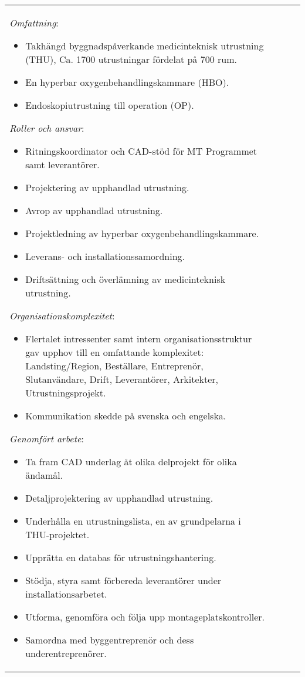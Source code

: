 \documentclass[a4paper, 10pt]{article}
\begin{document}
\begin{longtable}{@{\extracolsep{\fill}}p{} p{} Rp{0.1\textwidth}}
    \textit{Omfattning}:
    \begin{itemize}
        \item Takhängd byggnadspåverkande medicinteknisk utrustning (THU), Ca. 1700 utrustningar fördelat på 700 rum.
        \item En hyperbar oxygenbehandlingskammare (HBO).
        \item Endoskopiutrustning till operation (OP).
    \end{itemize}
    \textit{Roller och ansvar}:
    \begin{itemize}
        \item Ritningskoordinator och CAD-stöd för MT Programmet samt leverantörer.
        \item Projektering av upphandlad utrustning.
        \item Avrop av upphandlad utrustning.
        \item Projektledning av hyperbar oxygenbehandlingskammare.
        \item Leverans- och installationssamordning.
        \item Driftsättning och överlämning av medicinteknisk utrustning.
    \end{itemize}
    \textit{Organisationskomplexitet}:
    \begin{itemize}
        \item Flertalet intressenter samt intern organisationsstruktur gav upphov till en omfattande komplexitet: Landsting/Region, Beställare, Entreprenör, Slutanvändare, Drift, Leverantörer, Arkitekter, Utrustningsprojekt.
        \item Kommunikation skedde på svenska och engelska.
    \end{itemize}
    \textit{Genomfört arbete}:
    \begin{itemize}
        \item Ta fram CAD underlag åt olika delprojekt för olika ändamål.
        \item Detaljprojektering av upphandlad utrustning.
        \item Underhålla en utrustningslista, en av grundpelarna i THU-projektet.
        \item Upprätta en databas för utrustningshantering.
        \item Stödja, styra samt förbereda leverantörer under installationsarbetet.
        \item Utforma, genomföra och följa upp montageplatskontroller.
        \item Samordna med byggentreprenör och dess underentreprenörer.

\end{itemize}
\end{longtable}
\end{document}
